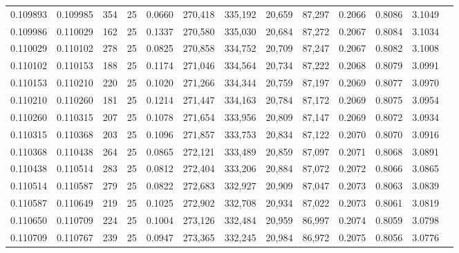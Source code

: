 \begin{tabular}{rrrrrrrrrrrrr}
0.109893 & 0.109985 &   354 &  25 &                                     0.0660 & 270,418 & 335,192 &  20,659 &  87,297 & 0.2066 & 0.8086 & 3.1049 \\
0.109986 & 0.110029 &   162 &  25 &                                     0.1337 & 270,580 & 335,030 &  20,684 &  87,272 & 0.2067 & 0.8084 & 3.1034 \\
0.110029 & 0.110102 &   278 &  25 &                                     0.0825 & 270,858 & 334,752 &  20,709 &  87,247 & 0.2067 & 0.8082 & 3.1008 \\
0.110102 & 0.110153 &   188 &  25 &                                     0.1174 & 271,046 & 334,564 &  20,734 &  87,222 & 0.2068 & 0.8079 & 3.0991 \\
0.110153 & 0.110210 &   220 &  25 &                                     0.1020 & 271,266 & 334,344 &  20,759 &  87,197 & 0.2069 & 0.8077 & 3.0970 \\
0.110210 & 0.110260 &   181 &  25 &                                     0.1214 & 271,447 & 334,163 &  20,784 &  87,172 & 0.2069 & 0.8075 & 3.0954 \\
0.110260 & 0.110315 &   207 &  25 &                                     0.1078 & 271,654 & 333,956 &  20,809 &  87,147 & 0.2069 & 0.8072 & 3.0934 \\
0.110315 & 0.110368 &   203 &  25 &                                     0.1096 & 271,857 & 333,753 &  20,834 &  87,122 & 0.2070 & 0.8070 & 3.0916 \\
0.110368 & 0.110438 &   264 &  25 &                                     0.0865 & 272,121 & 333,489 &  20,859 &  87,097 & 0.2071 & 0.8068 & 3.0891 \\
0.110438 & 0.110514 &   283 &  25 &                                     0.0812 & 272,404 & 333,206 &  20,884 &  87,072 & 0.2072 & 0.8066 & 3.0865 \\
0.110514 & 0.110587 &   279 &  25 &                                     0.0822 & 272,683 & 332,927 &  20,909 &  87,047 & 0.2073 & 0.8063 & 3.0839 \\
0.110587 & 0.110649 &   219 &  25 &                                     0.1025 & 272,902 & 332,708 &  20,934 &  87,022 & 0.2073 & 0.8061 & 3.0819 \\
0.110650 & 0.110709 &   224 &  25 &                                     0.1004 & 273,126 & 332,484 &  20,959 &  86,997 & 0.2074 & 0.8059 & 3.0798 \\
0.110709 & 0.110767 &   239 &  25 &                                     0.0947 & 273,365 & 332,245 &  20,984 &  86,972 & 0.2075 & 0.8056 & 3.0776 \\

\end{tabular}
